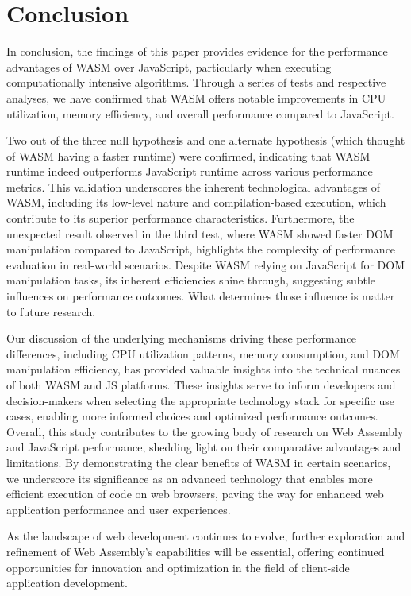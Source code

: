 \newpage
\section{Conclusion} \label{conclusion}
In conclusion, the findings of this paper provides evidence for the performance advantages of WASM over JavaScript, particularly when executing computationally intensive algorithms. Through a series of tests and respective analyses, we have confirmed that WASM offers notable improvements in CPU utilization, memory efficiency, and overall performance compared to JavaScript.

Two out of the three null hypothesis and one alternate hypothesis (which thought of WASM having a faster runtime) were confirmed, indicating that WASM runtime indeed outperforms JavaScript runtime across various performance metrics. This validation underscores the inherent technological advantages of WASM, including its low-level nature and compilation-based execution, which contribute to its superior performance characteristics. Furthermore, the unexpected result observed in the third test, where WASM showed faster DOM manipulation compared to JavaScript, highlights the complexity of performance evaluation in real-world scenarios. Despite WASM relying on JavaScript for DOM manipulation tasks, its inherent efficiencies shine through, suggesting subtle influences on performance outcomes. What determines those influence is matter to future research.

Our discussion of the underlying mechanisms driving these performance differences, including CPU utilization patterns, memory consumption, and DOM manipulation efficiency, has provided valuable insights into the technical nuances of both WASM and JS platforms. These insights serve to inform developers and decision-makers when selecting the appropriate technology stack for specific use cases, enabling more informed choices and optimized performance outcomes. Overall, this study contributes to the growing body of research on Web Assembly and JavaScript performance, shedding light on their comparative advantages and limitations. By demonstrating the clear benefits of WASM in certain scenarios, we underscore its significance as an advanced technology that enables more efficient execution of code on web browsers, paving the way for enhanced web application performance and user experiences.

As the landscape of web development continues to evolve, further exploration and refinement of Web Assembly's capabilities will be essential, offering continued opportunities for innovation and optimization in the field of client-side application development.